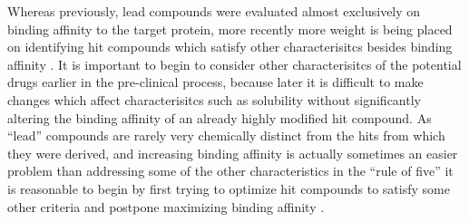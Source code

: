 Whereas previously, lead compounds were evaluated almost exclusively on binding affinity to the target protein, more recently more weight is being placed on identifying hit compounds which satisfy other characterisitcs besides binding affinity \cite{bleicher2003hit}.
It is important to begin to consider other characterisitcs of the potential drugs earlier in the pre-clinical process, because later it is difficult to make changes which affect characterisitcs such as solubility without significantly altering the binding affinity of an already highly modified hit compound.
As ``lead'' compounds are rarely very chemically distinct from the hits from which they were derived, and increasing binding affinity is actually sometimes an easier problem than addressing some of the other characteristics in the ``rule of five'' it is reasonable to begin by first trying to optimize hit compounds to satisfy some other criteria and postpone maximizing binding affinity \cite{proudfoot2002drugs}.

